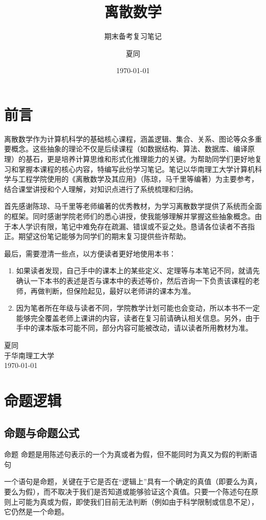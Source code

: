 \documentclass[lang=cn,11pt]{elegantbook}
\title{离散数学}
\subtitle{期末备考复习笔记}
\author{夏同}
\institute{华南理工大学}
\date{\today}
\begin{document}
\maketitle
\frontmatter\chapter*{前言}

离散数学作为计算机科学的基础核心课程，涵盖逻辑、集合、关系、图论等众多重要概念。这些抽象的理论不仅是后续课程（如数据结构、算法、数据库、编译原理）的基石，更是培养计算思维和形式化推理能力的关键。为帮助同学们更好地复习和掌握本课程的核心内容，特编写此份学习笔记。笔记以华南理工大学计算机科学与工程学院使用的《离散数学及其应用》（陈琼，马千里等编著）为主要参考，结合课堂讲授和个人理解，对知识点进行了系统梳理和归纳。

首先感谢陈琼、马千里等老师编著的优秀教材，为学习离散数学提供了系统而全面的框架。同时感谢学院老师们的悉心讲授，使我能够理解并掌握这些抽象概念。由于本人学识有限，笔记中难免存在疏漏、错误或不妥之处。恳请各位读者不吝指正。期望这份笔记能够为同学们的期末复习提供些许帮助。

最后，需要澄清一些点，以方便读者更好地使用本书：
\begin{enumerate}
    \item 如果读者发现，自己手中的课本上的某些定义、定理等与本笔记不同，就请先确认一下本书的表述是否与课本中的表述等价，然后咨询一下负责该课程的老师，再做判断，但保险起见，最好以老师讲的课本为准。
    \item 因为笔者所在年级与读者不同，学院教学计划可能也会变动，所以本书不一定能够完全覆盖老师上课讲的内容，读者在复习前请确认相关信息。另外，由于手中的课本版本可能不同，部分内容可能被改动，请以读者所用教材为准。
\end{enumerate}


\vspace{0.5cm}
\begin{flushright}
夏同\\
于华南理工大学\\
\today
\end{flushright}


\tableofcontents

\mainmatter
\chapter{命题逻辑}
\section{命题与命题公式}
\begin{definition}{命题}
    命题是用陈述句表示的一个为真或者为假，但不能同时为真又为假的判断语句
\end{definition}
一个语句是命题，关键在于它是否在“逻辑上”具有一个确定的真值（即要么为真，要么为假），而不取决于我们是否知道或能够验证这个真值。只要一个陈述句在原则上可能为真或为假，即使我们目前无法判断（例如由于科学限制或信息不足），它仍然是一个命题。
\end{document}

